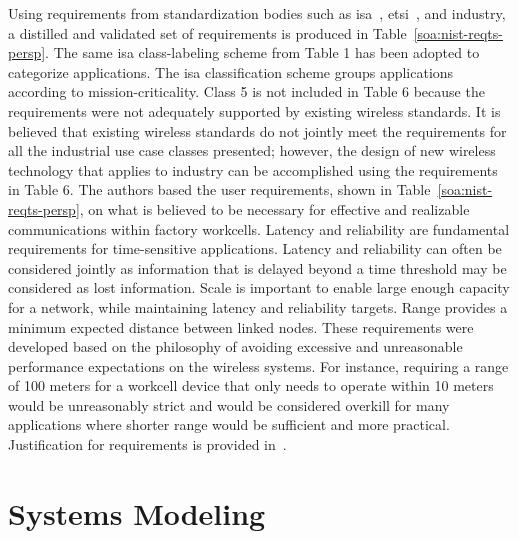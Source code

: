 Using requirements from standardization bodies such as \gls{isa}~\cite{ISATR100-2011}, \gls{etsi}~\cite{etsi103588}, and industry, a distilled and validated set of requirements is produced in Table~\ref{soa:nist-reqts-persp}. The same \gls{isa} class-labeling scheme from Table 1 has been adopted to categorize applications. The \gls{isa} classification scheme groups applications according to mission-criticality. Class 5 is not included in Table 6 because the requirements were not adequately supported by existing wireless standards. It is believed that existing wireless standards do not jointly meet the requirements for all the industrial use case classes presented; however, the design of new wireless technology that applies to industry can be accomplished using the requirements in Table 6. The authors based the user requirements, shown in Table~\ref{soa:nist-reqts-persp}, on what is believed to be necessary for effective and realizable communications within factory workcells. Latency and reliability are fundamental requirements for time-sensitive applications. Latency and reliability can often be considered jointly as information that is delayed beyond a time threshold may be considered as lost information. Scale is important to enable large enough capacity for a network, while maintaining latency and reliability targets. Range provides a minimum expected distance between linked nodes. These requirements were developed based on the philosophy of avoiding excessive and unreasonable performance expectations on the wireless systems. For instance, requiring a range of 100 meters for a workcell device that only needs to operate within 10 meters would be unreasonably strict and would be considered overkill for many applications where shorter range would be sufficient and more practical. Justification for requirements is provided in~\cite{Montgomery2019}.



\section{Systems Modeling}\label{chapter:soa:modeling}

